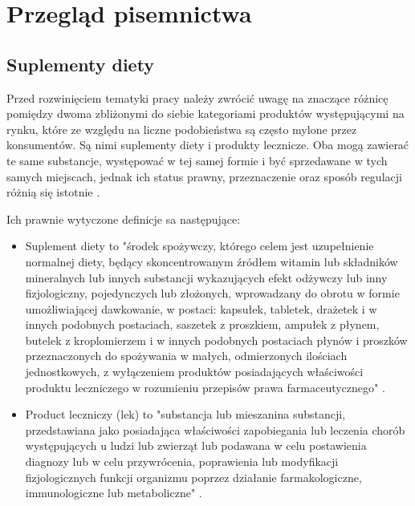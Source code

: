 \section{Przegląd pisemnictwa}\label{Przegląd pisemnictwa}



\subsection{Suplementy diety}

Przed rozwinięciem tematyki pracy należy zwrócić uwagę na znaczące różnicę pomiędzy dwoma zbliżonymi do siebie kategoriami produktów występującymi na rynku, które ze względu na liczne podobieństwa są często mylone przez konsumentów. Są nimi suplementy diety i produkty lecznicze. Oba mogą zawierać te same substancje, występować w tej samej formie i być sprzedawane w tych samych miejscach, jednak ich status prawny, przeznaczenie oraz sposób regulacji różnią się istotnie \cite{suplementy-a-leki}.

Ich prawnie wytyczone definicje sa następujące:
\begin{itemize}
    \item Suplement diety to "środek spożywczy, którego celem jest uzupełnienie normalnej diety, będący skoncentrowanym źródłem witamin lub składników mineralnych lub innych substancji wykazujących efekt odżywczy lub inny fizjologiczny, pojedynczych lub złożonych, wprowadzany do obrotu w formie umożliwiającej dawkowanie, w postaci: kapsułek, tabletek, drażetek i w innych podobnych postaciach, saszetek z proszkiem, ampułek z płynem, butelek z kroplomierzem i w innych podobnych postaciach płynów i proszków przeznaczonych do spożywania w małych, odmierzonych ilościach jednostkowych, z wyłączeniem produktów posiadających właściwości produktu leczniczego w rozumieniu przepisów prawa farmaceutycznego" \cite{definicja-suplementy-pl}.
    \item Product leczniczy (lek) to "substancja lub mieszanina substancji, przedstawiana jako posiadająca właściwości zapobiegania lub leczenia chorób występujących u ludzi lub zwierząt lub podawana w celu postawienia diagnozy lub w celu przywrócenia, poprawienia lub modyfikacji fizjologicznych funkcji organizmu poprzez działanie farmakologiczne, immunologiczne lub metaboliczne" \cite{definicja-lek-pl}.
\end{itemize}


